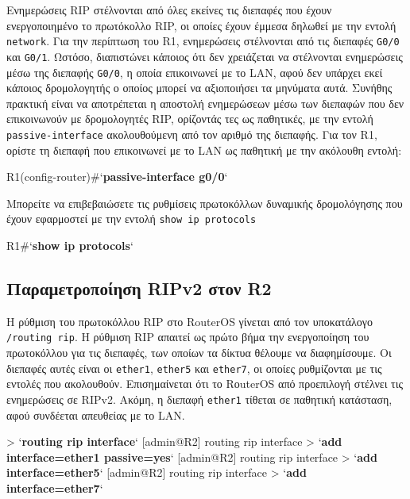 \documentclass{EdipyLabs} %
\begin{document}
Ενημερώσεις RIP στέλνονται από όλες εκείνες τις διεπαφές που έχουν ενεργοποιημένο το πρωτόκολλο RIP, οι οποίες έχουν έμμεσα δηλωθεί με την εντολή \texttt{network}. Για την περίπτωση του R1, ενημερώσεις στέλνονται από τις διεπαφές \texttt{G0/0} και \texttt{G0/1}. Ωστόσο, διαπιστώνει κάποιος ότι δεν χρειάζεται να στέλνονται ενημερώσεις μέσω της διεπαφής \texttt{G0/0}, η οποία επικοινωνεί με το LAN, αφού δεν υπάρχει εκεί κάποιος δρομολογητής ο οποίος μπορεί να αξιοποιήσει τα μηνύματα αυτά. Συνήθης πρακτική είναι να αποτρέπεται η αποστολή ενημερώσεων μέσω των διεπαφών που δεν επικοινωνούν με δρομολογητές RIP, ορίζοντάς τες ως παθητικές, με την εντολή \texttt{passive-interface} ακολουθούμενη από τον αριθμό της διεπαφής. Για τον R1, ορίστε τη διεπαφή που επικοινωνεί με το LAN ως παθητική με την ακόλουθη εντολή:

\begin{CommandBox}
R1(config-router)#`\textbf{passive-interface g0/0}`
\end{CommandBox}

Μπορείτε να επιβεβαιώσετε τις ρυθμίσεις πρωτοκόλλων δυναμικής δρομολόγησης που έχουν εφαρμοστεί με την εντολή \texttt{show ip protocols}

\begin{CommandBox}
R1#`\textbf{show ip protocols}`
\end{CommandBox}

\subsection{Παραμετροποίηση RIPv2 στον R2}
Η ρύθμιση του πρωτοκόλλου RIP στο RouterOS γίνεται από τον υποκατάλογο \texttt{/routing rip}. Η ρύθμιση RIP απαιτεί ως πρώτο βήμα την ενεργοποίηση του πρωτοκόλλου για τις διεπαφές, των οποίων τα δίκτυα θέλουμε να διαφημίσουμε. Οι διεπαφές αυτές είναι οι \texttt{ether1}, \texttt{ether5} και \texttt{ether7}, οι οποίες ρυθμίζονται με τις εντολές που ακολουθούν. Επισημαίνεται ότι το RοuterOS από προεπιλογή στέλνει τις ενημερώσεις σε RIPv2. Ακόμη, η διεπαφή \texttt{ether1} τίθεται σε παθητική κατάσταση, αφού συνδέεται απευθείας με το LAN. 

\begin{CommandBox}
[admin@R2] > `\textbf{routing rip interface}`
[admin@R2] routing rip interface > `\textbf{add interface=ether1 passive=yes}`
[admin@R2] routing rip interface > `\textbf{add interface=ether5}`
[admin@R2] routing rip interface > `\textbf{add interface=ether7}`
\end{CommandBox}
\end{document}
